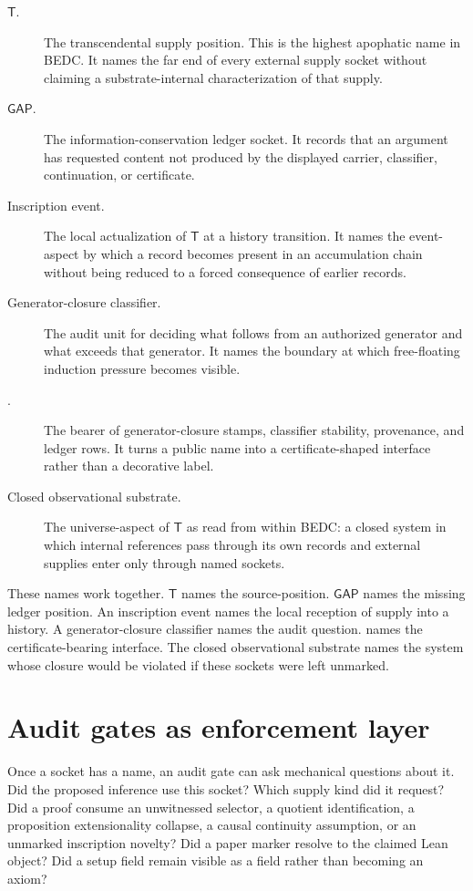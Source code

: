 \begin{description}
\item[$\mathsf{T}$.] The transcendental supply position. This is the highest apophatic name in BEDC. It names the far end of every external supply socket without claiming a substrate-internal characterization of that supply.
\item[$\mathsf{GAP}$.] The information-conservation ledger socket. It records that an argument has requested content not produced by the displayed carrier, classifier, continuation, or certificate.
\item[Inscription event.] The local actualization of $\mathsf{T}$ at a history transition. It names the event-aspect by which a record becomes present in an accumulation chain without being reduced to a forced consequence of earlier records.
\item[Generator-closure classifier.] The audit unit for deciding what follows from an authorized generator and what exceeds that generator. It names the boundary at which free-floating induction pressure becomes visible.
\item[\NameCert{}.] The bearer of generator-closure stamps, classifier stability, provenance, and ledger rows. It turns a public name into a certificate-shaped interface rather than a decorative label.
\item[Closed observational substrate.] The universe-aspect of $\mathsf{T}$ as read from within BEDC: a closed system in which internal references pass through its own records and external supplies enter only through named sockets.
\end{description}

These names work together. $\mathsf{T}$ names the source-position. $\mathsf{GAP}$ names the missing ledger position. An inscription event names the local reception of supply into a history. A generator-closure classifier names the audit question. \NameCert{} names the certificate-bearing interface. The closed observational substrate names the system whose closure would be violated if these sockets were left unmarked.

\section{Audit gates as enforcement layer}
\label{sec:apophatic-naming-audit-gates}

Once a socket has a name, an audit gate can ask mechanical questions about it. Did the proposed inference use this socket? Which supply kind did it request? Did a proof consume an unwitnessed selector, a quotient identification, a proposition extensionality collapse, a causal continuity assumption, or an unmarked inscription novelty? Did a paper marker resolve to the claimed Lean object? Did a setup field remain visible as a field rather than becoming an axiom?

